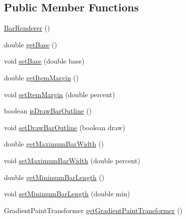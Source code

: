 \subsection*{Public Member Functions}
\begin{DoxyCompactItemize}
\item 
\mbox{\hyperlink{classorg_1_1jfree_1_1chart_1_1renderer_1_1category_1_1_bar_renderer_a7ce92f108ce0c06ec686a1cf7726286d}{Bar\+Renderer}} ()
\item 
double \mbox{\hyperlink{classorg_1_1jfree_1_1chart_1_1renderer_1_1category_1_1_bar_renderer_ac6046a96ca5f1da74dc46393ad19a866}{get\+Base}} ()
\item 
void \mbox{\hyperlink{classorg_1_1jfree_1_1chart_1_1renderer_1_1category_1_1_bar_renderer_af998b6dafee9431ff2ec95422d0d5e4f}{set\+Base}} (double base)
\item 
double \mbox{\hyperlink{classorg_1_1jfree_1_1chart_1_1renderer_1_1category_1_1_bar_renderer_aea515b299aef9bd050aa0a633abd25aa}{get\+Item\+Margin}} ()
\item 
void \mbox{\hyperlink{classorg_1_1jfree_1_1chart_1_1renderer_1_1category_1_1_bar_renderer_aa1a02fa837f9a309c0cc4f94683d4104}{set\+Item\+Margin}} (double percent)
\item 
boolean \mbox{\hyperlink{classorg_1_1jfree_1_1chart_1_1renderer_1_1category_1_1_bar_renderer_a93b7d40219432ad6890575cbebbd3296}{is\+Draw\+Bar\+Outline}} ()
\item 
void \mbox{\hyperlink{classorg_1_1jfree_1_1chart_1_1renderer_1_1category_1_1_bar_renderer_ae1e06caa24551602f7d3953ca986d34f}{set\+Draw\+Bar\+Outline}} (boolean draw)
\item 
double \mbox{\hyperlink{classorg_1_1jfree_1_1chart_1_1renderer_1_1category_1_1_bar_renderer_a0a271c04fe983fa094c5ba531d40d471}{get\+Maximum\+Bar\+Width}} ()
\item 
void \mbox{\hyperlink{classorg_1_1jfree_1_1chart_1_1renderer_1_1category_1_1_bar_renderer_a125a31aa3e88e6ab0e63e0efa245994f}{set\+Maximum\+Bar\+Width}} (double percent)
\item 
double \mbox{\hyperlink{classorg_1_1jfree_1_1chart_1_1renderer_1_1category_1_1_bar_renderer_a3ab1b4f3db7af3d3738dec75eac4fe08}{get\+Minimum\+Bar\+Length}} ()
\item 
void \mbox{\hyperlink{classorg_1_1jfree_1_1chart_1_1renderer_1_1category_1_1_bar_renderer_a4c13304765f93c80151f181cc96b5ea6}{set\+Minimum\+Bar\+Length}} (double min)
\item 
Gradient\+Paint\+Transformer \mbox{\hyperlink{classorg_1_1jfree_1_1chart_1_1renderer_1_1category_1_1_bar_renderer_a4f1742f14bcdfcd92b36694668f85ee6}{get\+Gradient\+Paint\+Transformer}} ()

\end{DoxyCompactItemize}
